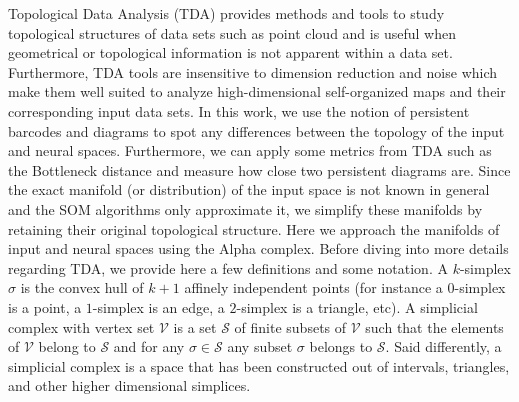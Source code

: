 
\label{sec:tda}

Topological Data Analysis (TDA) \citep{Carlsson:2009} provides methods and tools to study topological structures of data sets such as point cloud and is useful when geometrical or topological information is not apparent within a data set. Furthermore, TDA tools are insensitive to dimension reduction and noise which make them well suited to analyze high-dimensional self-organized maps and their corresponding input data sets. In this work, we use the notion of persistent barcodes and diagrams \citep{Edelsbrunner:2008} to spot any differences between the topology of the input and neural spaces. Furthermore, we can apply some metrics from TDA such as the Bottleneck distance and measure how close two persistent diagrams are.
Since the exact manifold (or distribution) of the input space is not known in general and the SOM algorithms only approximate it, we simplify these manifolds by retaining their original topological structure.
Here we approach the manifolds of input and neural spaces using the Alpha complex. Before diving into more details regarding TDA, we provide here a few definitions and some notation. A $k$-simplex $\sigma$ is the convex hull of $k+1$ affinely independent points (for instance a $0$-simplex is a point, a $1$-simplex is an edge, a $2$-simplex is a triangle, etc). A simplicial complex with vertex set $\mathcal{V}$ is a set $\mathcal{S}$ of finite subsets of $\mathcal{V}$ such that the elements of $\mathcal{V}$ belong to $\mathcal{S}$ and for any $\sigma \in \mathcal{S}$ any subset $\sigma$ belongs to $\mathcal{S}$. Said differently, a simplicial complex is a space that has been  constructed out of intervals, triangles, and other higher dimensional simplices.

